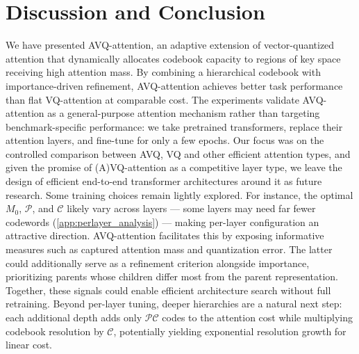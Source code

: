 \section{Discussion and Conclusion}
\label{sec:conclusion}
We have presented AVQ-attention, an adaptive extension of vector-quantized attention that dynamically allocates codebook capacity to regions of key space receiving high attention mass. By combining a hierarchical codebook with importance-driven refinement, AVQ-attention achieves better task performance than flat VQ-attention at comparable cost.
The experiments validate AVQ-attention as a general-purpose attention mechanism rather than targeting benchmark-specific performance: we take pretrained transformers, replace their attention layers, and fine-tune for only a few epochs. Our focus was on the controlled comparison between AVQ, VQ and other efficient attention types, and given the promise of (A)VQ-attention as a competitive layer type, we leave the design of efficient end-to-end transformer architectures around it as future research.
Some training choices remain lightly explored.  For instance, the optimal $M_0$, $\mathcal{P}$, and $\mathcal{C}$ likely vary across layers --- some layers may need far fewer codewords (\cref{app:perlayer_analysis}) --- making per-layer configuration an attractive direction. AVQ-attention facilitates this by exposing informative measures such as captured attention mass and quantization error. The latter could additionally serve as a refinement criterion alongside importance, prioritizing parents whose children differ most from the parent representation. Together, these signals could enable efficient architecture search without full retraining.
Beyond per-layer tuning, deeper hierarchies are a natural next step: each additional depth adds only $\mathcal{P}\mathcal{C}$ codes to the attention cost while multiplying codebook resolution by $\mathcal{C}$, potentially yielding exponential resolution growth for linear cost.

